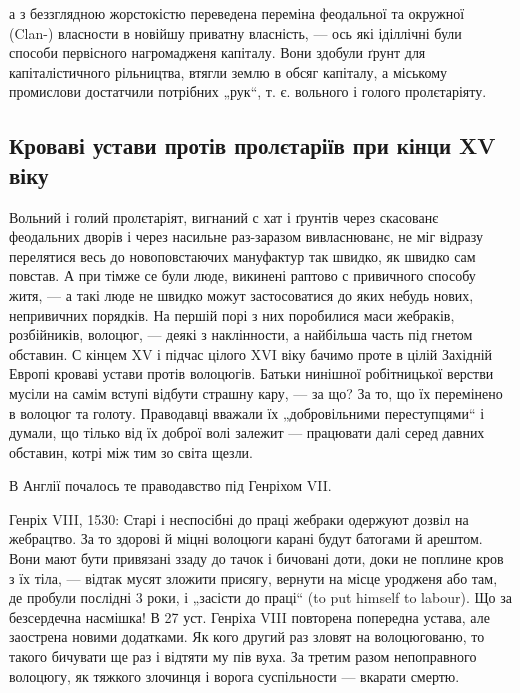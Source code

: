 \parcont{}
а з беззглядною жорстокістю переведена переміна феодальної та окружної (Clan-)
власности в новійшу приватну власність, — ось які іділлічні були способи
первісного нагромадженя капіталу. Вони здобули ґрунт для капіталістичного
рільництва, втягли землю в обсяг капіталу, а міському промислови
достатчили потрібних „рук“, т. є. вольного і голого пролєтаріяту.

\subsection{Кроваві устави протів пролєтаріїв при кінци XV віку}

Вольний і голий пролєтаріят, вигнаний с хат і ґрунтів
через скасованє феодальних дворів і через насильне раз-заразом
вивласнюванє, не міг відразу перелятися весь до
новоповстаючих мануфактур так швидко, як швидко сам
повстав. А при тімже се були люде, викинені раптово с привичного
способу житя, — а такі люде не швидко можут
застосоватися до яких небудь нових, непривичних порядків.
На першій порі з них поробилися маси жебраків, розбійників,
волоцюг, — деякі з наклінности, а найбільша часть під гнетом обставин. С
кінцем XV і підчас цілого XVI віку бачимо проте в цілій Західній Европі
кроваві устави протів волоцюгів. Батьки нинішної робітницької верстви мусіли
на самім вступі відбути страшну кару, — за що? За то, що їх перемінено в волоцюг
та голоту. Праводавці вважали їх „добровільними переступцями“ і думали, що
тілько від їх доброї волі залежит — працювати далі серед давних обставин, котрі
між тим зо світа щезли.

В Англії почалось те праводавство під Генріхом VII.

Генріх VIII, 1530: Старі і неспосібні до праці жебраки одержуют дозвіл на
жебрацтво. За то здорові й міцні волоцюги карані будут батогами й арештом. Вони
мают бути привязані ззаду до тачок і бичовані доти, доки не поплине кров з їх
тіла, — відтак мусят зложити присягу, вернути на місце уродженя або там, де
пробули послідні 3 роки, і „засісти до праці“ (to put himself to labour). Що за
безсердечна насмішка! В 27 уст. Генріха VIII повторена попередна устава, але
заострена новими додатками. Як кого другий раз зловят на волоцюгованю, то такого
бичувати ще раз і відтяти му пів вуха. За третим разом непоправного волоцюгу,
як тяжкого злочинця і ворога суспільности — вкарати смертю.

